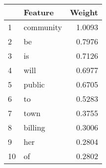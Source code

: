 \begin{tabular}{llr}
\toprule
{} &    Feature &  Weight \\
\midrule
1  &  community &  1.0093 \\
2  &         be &  0.7976 \\
3  &         is &  0.7126 \\
4  &       will &  0.6977 \\
5  &     public &  0.6705 \\
6  &         to &  0.5283 \\
7  &       town &  0.3755 \\
8  &    billing &  0.3006 \\
9  &        her &  0.2804 \\
10 &         of &  0.2802 \\
\bottomrule
\end{tabular}
